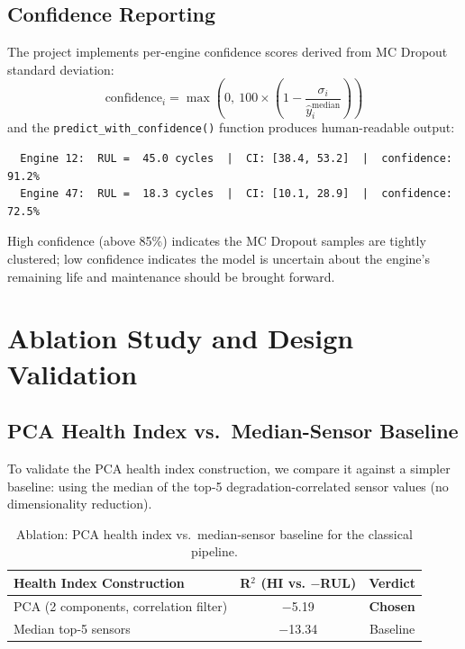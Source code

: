\documentclass[12pt,a4paper]{report}
\begin{document}
\section{Confidence Reporting}

The project implements per-engine confidence scores derived from MC Dropout standard deviation:
\[
\text{confidence}_i = \max\!\left(0,\ 100 \times \left(1 - \frac{\sigma_i}{\hat{y}_i^{\text{median}}}\right)\right)
\]
and the \texttt{predict\_with\_confidence()} function produces human-readable output:
\begin{verbatim}
  Engine 12:  RUL =  45.0 cycles  |  CI: [38.4, 53.2]  |  confidence: 91.2%
  Engine 47:  RUL =  18.3 cycles  |  CI: [10.1, 28.9]  |  confidence: 72.5%
\end{verbatim}

High confidence (above 85\%) indicates the MC Dropout samples are tightly clustered; low confidence indicates the model is uncertain about the engine's remaining life and maintenance should be brought forward.

\chapter{Ablation Study and Design Validation}
\label{chap:ablation}

\section{PCA Health Index vs.\ Median-Sensor Baseline}

To validate the PCA health index construction, we compare it against a simpler baseline: using the median of the top-5 degradation-correlated sensor values (no dimensionality reduction).

\begin{table}[H]
\centering
\caption{Ablation: PCA health index vs.\ median-sensor baseline for the classical pipeline.}
\label{tab:ablation_pca}
\begin{tabular}{lcc}
\toprule
\textbf{Health Index Construction} & \textbf{R$^2$ (HI vs. $-$RUL)} & \textbf{Verdict} \\
\midrule
PCA (2 components, correlation filter) & $-$5.19 & \textbf{Chosen} \\
Median top-5 sensors                   & $-$13.34 & Baseline \\
\bottomrule
\end{tabular}
\end{table}
\end{document}
